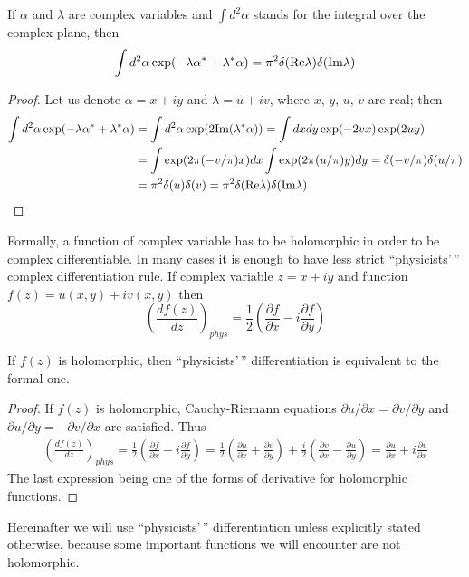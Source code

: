 \begin{lemma}
If $\alpha$ and $\lambda$ are complex variables and $\int d^2\alpha$ stands for the integral over the complex plane, then
\[
	\int d^2\alpha \exp(-\lambda \alpha^* + \lambda^* \alpha)
	= \pi^2 \delta(\mathrm{Re} \lambda) \delta(\mathrm{Im} \lambda)
\]
\end{lemma}
\begin{proof}
Let us denote $\alpha = x + iy$ and $\lambda = u + iv$, where $x,\,y,\,u,\,v$ are real; then
\begin{equation*}
\begin{split}
	\int d^2\alpha \exp(-\lambda \alpha^* + \lambda^* \alpha)
	& = \int d^2\alpha \exp(2 \mathrm{Im}(\lambda^* \alpha))
	= \int dx dy \exp(-2vx) \exp(2uy) \\
	& = \int \exp(2\pi (-v / \pi) x) dx \int \exp(2\pi (u / \pi) y) dy
	= \delta(-v / \pi) \delta(u / \pi) \\
	& = \pi^2 \delta(u) \delta(v)
	= \pi^2 \delta(\mathrm{Re} \lambda) \delta(\mathrm{Im} \lambda)
	\qedhere
\end{split}
\end{equation*}
\end{proof}

Formally, a function of complex variable has to be holomorphic in order to be complex differentiable.
In many cases it is enough to have less strict ``physicists'\,'' complex differentiation rule.
If complex variable $z = x + iy$ and function $f(z) = u(x, y) + iv(x, y)$ then
\[
	\left( \frac{df(z)}{dz} \right)_{phys}
	= \frac{1}{2} \left(
		\frac{\partial f}{\partial x} - i \frac{\partial f}{\partial y}
	\right)
\]

\begin{lemma}
\label{lmm:multimode-formalism:phys-diff}
If $f(z)$ is holomorphic, then ``physicists'\,'' differentiation is equivalent to the formal one.
\end{lemma}
\begin{proof}
If $f(z)$ is holomorphic, Cauchy-Riemann equations $\partial u / \partial x = \partial v / \partial y$ and $\partial u / \partial y = -\partial v / \partial x$ are satisfied.
Thus
\begin{equation*}
\begin{split}
	\left( \frac{df(z)}{dz} \right)_{phys}
	= \frac{1}{2} \left(
		\frac{\partial f}{\partial x} - i \frac{\partial f}{\partial y}
	\right)
	= \frac{1}{2} \left(
		\frac{\partial u}{\partial x} + \frac{\partial v}{\partial y}
	\right)
	+ \frac{i}{2} \left(
		\frac{\partial v}{\partial x} - \frac{\partial u}{\partial y}
	\right)
	= \frac{\partial u}{\partial x} + i \frac{\partial v}{\partial x}
\end{split}
\end{equation*}
The last expression being one of the forms of derivative for holomorphic functions.
\end{proof}

Hereinafter we will use ``physicists'\,'' differentiation unless explicitly stated otherwise,
because some important functions we will encounter are not holomorphic.

